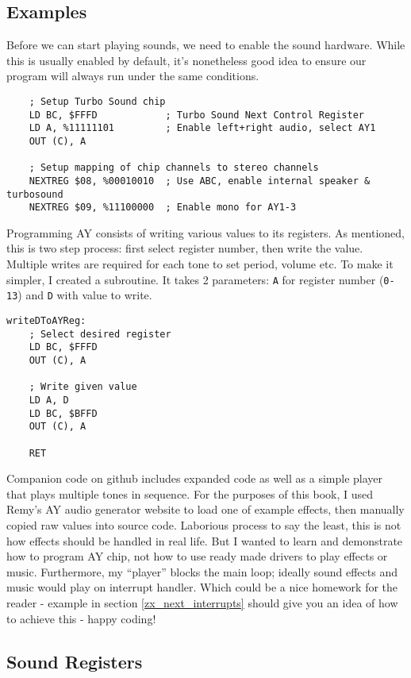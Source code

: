 \documentclass[12pt,twoside,openright,a4paper]{book}
\begin{document}
\subsection{Examples}

Before we can start playing sounds, we need to enable the sound hardware. While this is usually enabled by default, it's nonetheless good idea to ensure our program will always run under the same conditions.

\begin{Verbatim}
	; Setup Turbo Sound chip
	LD BC, $FFFD            ; Turbo Sound Next Control Register
	LD A, %11111101         ; Enable left+right audio, select AY1
	OUT (C), A
	
	; Setup mapping of chip channels to stereo channels
	NEXTREG $08, %00010010  ; Use ABC, enable internal speaker & turbosound
	NEXTREG $09, %11100000  ; Enable mono for AY1-3
\end{Verbatim}

Programming AY consists of writing various values to its registers. As mentioned, this is two step process: first select register number, then write the value. Multiple writes are required for each tone to set period, volume etc. To make it simpler, I created a subroutine. It takes 2 parameters: {\tt A} for register number ({\tt 0-13}) and {\tt D} with value to write.

\begin{Verbatim}
writeDToAYReg:
	; Select desired register
	LD BC, $FFFD
	OUT (C), A
	
	; Write given value
	LD A, D
	LD BC, $BFFD
	OUT (C), A
	
	RET
\end{Verbatim}

Companion code on github includes expanded code as well as a simple player that plays multiple tones in sequence. For the purposes of this book, I used Remy's AY audio generator website to load one of example effects, then manually copied raw values into source code. Laborious process to say the least, this is not how effects should be handled in real life. But I wanted to learn and demonstrate how to program AY chip, not how to use ready made drivers to play effects or music. Furthermore, my ``player'' blocks the main loop; ideally sound effects and music would play on interrupt handler. Which could be a nice homework for the reader - example in section \ref{zx_next_interrupts} should give you an idea of how to achieve this - happy coding!


\pagebreak
\subsection{Sound Registers}
\end{document}

